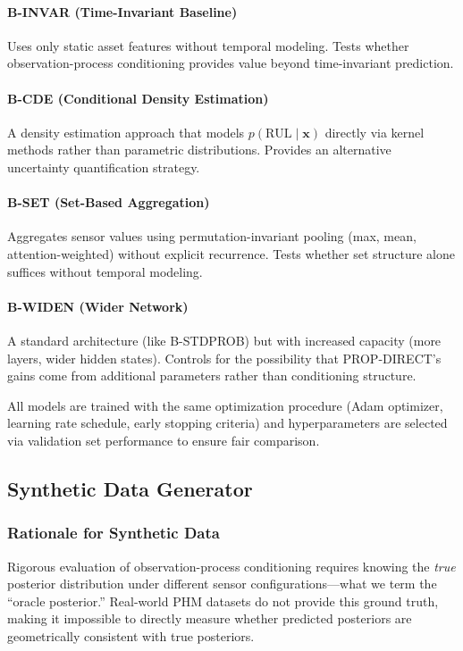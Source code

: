 \paragraph{B-INVAR (Time-Invariant Baseline)}
Uses only static asset features without temporal modeling. Tests whether observation-process conditioning provides value beyond time-invariant prediction.

\paragraph{B-CDE (Conditional Density Estimation)}
A density estimation approach that models $p(\text{RUL} \mid \mathbf{x})$ directly via kernel methods rather than parametric distributions. Provides an alternative uncertainty quantification strategy.

\paragraph{B-SET (Set-Based Aggregation)}
Aggregates sensor values using permutation-invariant pooling (max, mean, attention-weighted) without explicit recurrence. Tests whether set structure alone suffices without temporal modeling.

\paragraph{B-WIDEN (Wider Network)}
A standard architecture (like B-STDPROB) but with increased capacity (more layers, wider hidden states). Controls for the possibility that PROP-DIRECT's gains come from additional parameters rather than conditioning structure.

All models are trained with the same optimization procedure (Adam optimizer, learning rate schedule, early stopping criteria) and hyperparameters are selected via validation set performance to ensure fair comparison.

\subsection{Synthetic Data Generator}
\label{sec:methods:generator}

\subsubsection{Rationale for Synthetic Data}

Rigorous evaluation of observation-process conditioning requires knowing the \emph{true} posterior distribution under different sensor configurations—what we term the ``oracle posterior.'' Real-world PHM datasets do not provide this ground truth, making it impossible to directly measure whether predicted posteriors are geometrically consistent with true posteriors.

